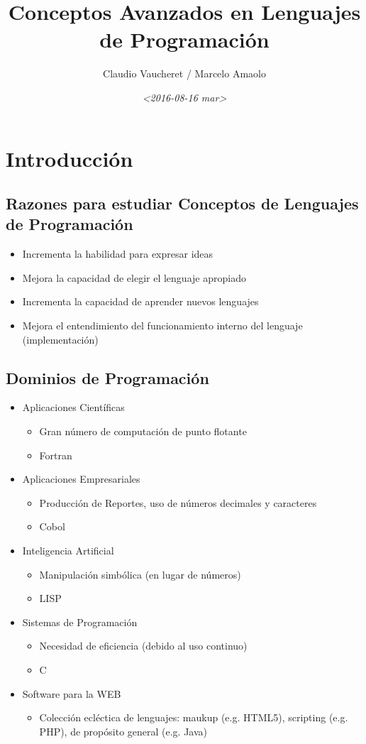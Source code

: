 \documentclass[11pt]{article}
\author{Claudio Vaucheret / Marcelo Amaolo}
\date{\textit{<2016-08-16 mar>}}
\title{Conceptos Avanzados en Lenguajes de Programación}
\begin{document}
\maketitle
\tableofcontents


\section*{Introducción}
\label{sec:orgheadline29}

\subsection*{Razones para estudiar Conceptos de Lenguajes de Programación}
\label{sec:orgheadline1}
\begin{itemize}
\item Incrementa la habilidad para expresar ideas
\item Mejora la capacidad de elegir el lenguaje apropiado
\item Incrementa la capacidad de aprender nuevos lenguajes
\item Mejora el entendimiento del funcionamiento interno del lenguaje
(implementación)
\end{itemize}

\subsection*{Dominios de Programación}
\label{sec:orgheadline2}
\begin{itemize}
\item Aplicaciones Científicas
\begin{itemize}
\item Gran número de computación de punto flotante
\item Fortran
\end{itemize}
\item Aplicaciones Empresariales
\begin{itemize}
\item Producción de Reportes, uso de números decimales y caracteres
\item Cobol
\end{itemize}
\item Inteligencia Artificial
\begin{itemize}
\item Manipulación simbólica (en lugar de números)
\item LISP
\end{itemize}
\item Sistemas de Programación
\begin{itemize}
\item Necesidad de eficiencia (debido al uso continuo)
\item C
\end{itemize}
\item Software para la WEB
\begin{itemize}
\item Colección ecléctica de lenguajes: maukup (e.g. HTML5), scripting
(e.g. PHP), de propósito general (e.g. Java)
\end{itemize}
\end{itemize}
\end{document}
